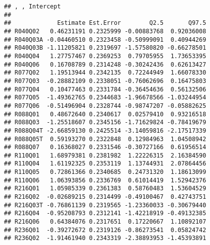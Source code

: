 \documentclass[
]{article}
\newenvironment{Shaded}{\begin{snugshade}}{\end{snugshade}}
\newcommand{\CommentTok}[1]{\textcolor[rgb]{0.56,0.35,0.01}{\textit{#1}}}
\newcommand{\FunctionTok}[1]{\textcolor[rgb]{0.13,0.29,0.53}{\textbf{#1}}}
\newcommand{\NormalTok}[1]{#1}
\newcommand{\SpecialCharTok}[1]{\textcolor[rgb]{0.81,0.36,0.00}{\textbf{#1}}}
\begin{document}
\begin{verbatim}
## , , Intercept
## 
##             Estimate Est.Error        Q2.5       Q97.5
## R040Q02   0.46231191 0.2325999 -0.00883768  0.92036008
## R040Q03A -0.04460510 0.2323458 -0.50999091  0.40944269
## R040Q03B -1.11205821 0.2319697 -1.57580820 -0.66278501
## R040Q04   1.27757467 0.2369253  0.79705955  1.73653395
## R040Q06   0.16708789 0.2314248 -0.30242436  0.62613427
## R077Q02   1.19513944 0.2342135  0.72244949  1.66078330
## R077Q03  -0.28882109 0.2338051 -0.76062696  0.16475803
## R077Q04   0.10477463 0.2331784 -0.36454636  0.56132506
## R077Q05  -1.49362765 0.2344683 -1.96678566 -1.03244954
## R077Q06  -0.51496904 0.2328744 -0.98747207 -0.05882625
## R088Q01   0.48672640 0.2340617  0.02579410  0.93216518
## R088Q03  -1.25518607 0.2345156 -1.71629824 -0.78419679
## R088Q04T -2.66859130 0.2425514 -3.14059816 -2.17517339
## R088Q05T  0.59193270 0.2322848  0.12984963  1.04508942
## R088Q07   0.16368027 0.2331546 -0.30727166  0.61956514
## R110Q01   1.68979381 0.2381982  1.22226315  2.16384590
## R110Q04   1.61192325 0.2353119  1.13744931  2.07864456
## R110Q05   0.72861366 0.2340685  0.24731320  1.18613099
## R110Q06   1.06393856 0.2336769  0.61014419  1.52942376
## R216Q01   1.05985339 0.2361383  0.58760483  1.53604529
## R216Q02  -0.02689215 0.2314499 -0.49100467  0.42743751
## R216Q03T -0.76861139 0.2319565 -1.23360033 -0.30679440
## R216Q04  -0.95208793 0.2312141 -1.42218919 -0.49132385
## R216Q06   0.64384076 0.2317651  0.17220667  1.10892107
## R236Q01  -0.39272672 0.2319126 -0.86273541  0.05824742
## R236Q02  -1.91461940 0.2343319 -2.38893953 -1.45393891
\end{verbatim}

\begin{Shaded}
\end{Shaded}
\end{document}
